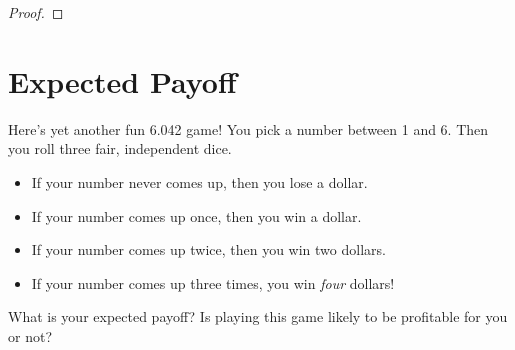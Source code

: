 \documentclass[12pt]{article}
\begin{document}
{\begin{proof}
\end{proof}

\iffalse

\begin{proof} %
\begin{align*}
\ex{R}
  & = \sum_{w \in S} R(w) \cdot \pr{w} & \text{def. of expectation}\\
  & = \sum_{w \in S} R(w) \cdot \paren{\sum_{k=1}^n \pr{w \mid E_k}
  \cdot \pr{E_k}} & \text{Total Probability} \\ & = \sum_{w \in S}
  \sum_{k=1}^n R(w) \cdot \pr{w \mid E_k} \cdot \pr{E_k} & \text{pull
  $R(w)$ into inner sum} \\ & = \sum_{k=1}^n \sum_{w \in S} R(w) \cdot
  \pr{w \mid E_k} \cdot \pr{E_k} & \text{swap sums} \\ & =
  \sum_{k=1}^n \pr{E_k} \cdot \paren{\sum_{w \in S} R(w) \cdot \pr{w
  \mid E_k}} & \text{pull $\pr{E_k}$ out} \\ & = \sum_{k=1}^n \pr{E_k}
  \cdot \ex{R \mid E_k} & \text{def. of cond. expectation}
\end{align*}
\end{proof}
\fi


\newpage
}


\section{Expected Payoff}
Here's yet another fun 6.042 game!  You pick a number between 1 and 6.
Then you roll three fair, independent dice.
%
\begin{itemize}
\item If your number never comes up, then you lose a dollar.
\item If your number comes up once, then you win a dollar.
\item If your number comes up twice, then you win two dollars.
\item If your number comes up three times, you win \textit{four} dollars!
\end{itemize}
%
What is your expected payoff?  Is playing this game likely to be
profitable for you or not?
\end{document}
